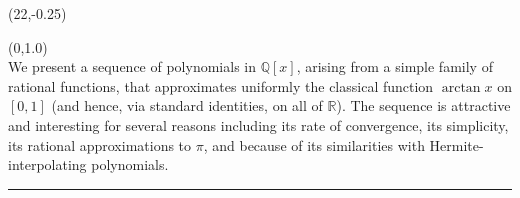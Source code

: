 \documentclass[a0]{a0poster}
\theoremstyle{definition}
\def\LHead#1{\noindent{\bf \LARGE\color{DarkBlue} #1}\smallskip}
\begin{document}
\begin{textblock}{2}(22,-0.25)
\end{textblock}
\begin{textblock}{7}(0,1.0)
\LHead{Abstract}\\
We present a sequence of polynomials in $\mathbb{Q}[x]$, arising
from a simple family of rational functions, that approximates
uniformly the classical function $\arctan x$ on $[0,1]$ (and hence,
via standard identities, on all of $\mathbb{R}$).  The sequence is
attractive and interesting for several reasons including its rate of
convergence, its simplicity, its rational approximations to $\pi$, and
because of its similarities with Hermite-interpolating polynomials.
\medskip
\hrule
\end{textblock}
\end{document}
